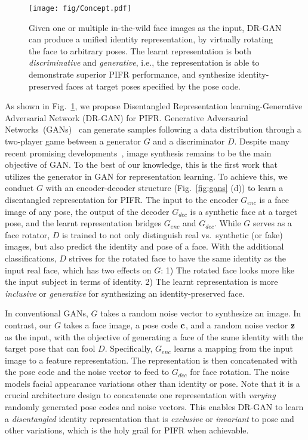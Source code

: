 \documentclass[10pt,journal,compsoc]{IEEEtran}
\begin{document}
\begin{figure}[t!]
\centering
\texttt{[image: fig/Concept.pdf]}
\vspace{-1mm}
\caption{\small Given one or multiple in-the-wild face images as the input, DR-GAN can produce a unified identity representation, by virtually rotating the face to arbitrary poses. The learnt representation is both {\it discriminative} and {\it generative}, i.e., the representation is able to demonstrate superior PIFR performance, and synthesize identity-preserved faces at target poses specified by the pose code.}
\label{fig:concept}
\figvspace 
\end{figure}%
As shown in Fig.~\ref{fig:concept}, we propose Disentangled Representation learning-Generative Adversarial Network (DR-GAN) for PIFR.
Generative Adversarial Networks~(GANs)~\cite{goodfellow2014generative} can generate samples following a data distribution through a two-player game between a generator $G$ and a discriminator $D$.
Despite many recent promising developments~\cite{mirza2014conditional, denton2015deep, radford2015unsupervised, chen2016infogan, berthelot2017began}, image synthesis remains to be the main objective of GAN.
To the best of our knowledge, this is the first work that utilizes the generator in GAN for representation learning.
To achieve this, we conduct $G$ with an encoder-decoder structure (Fig.~\ref{fig:gans} (d)) to learn a disentangled representation for PIFR.
The input to the encoder $G_{enc}$ is a face image of any pose, the output of the decoder $G_{dec}$ is a synthetic face at a target pose, and the learnt representation bridges $G_{enc}$ and $G_{dec}$. 
While $G$ serves as a face rotator, $D$ is trained to not only distinguish real vs.~synthetic (or fake) images, but also predict the identity and pose of a face.
With the additional classifications, $D$ strives for the rotated face to have the same identity as the input real face, which has two effects on $G$: 
1) The rotated face looks more like the input subject in terms of identity. 
2) The learnt representation is more {\it inclusive} or {\it generative} for synthesizing an identity-preserved face. 

In conventional GANs, $G$ takes a random noise vector to synthesize an image.
In contrast, our $G$ takes a face image, a pose code $\bf{c}$, and a random noise vector $\bf{z}$ as the input, with the objective of generating a face of the same identity with the target pose that can fool $D$.
Specifically, $G_{enc}$ learns a mapping from the input image to a feature representation. 
The representation is then concatenated with the pose code and the noise vector to feed to $G_{dec}$ for face rotation. 
The noise models facial appearance variations other than identity or pose. 
Note that it is a crucial architecture design to concatenate one representation with {\it varying} randomly generated pose codes and noise vectors.
This enables DR-GAN to learn a {\it disentangled} identity representation that is {\it exclusive} or {\it invariant} to pose and other variations, which is the holy grail for PIFR when achievable. 
\end{document}
